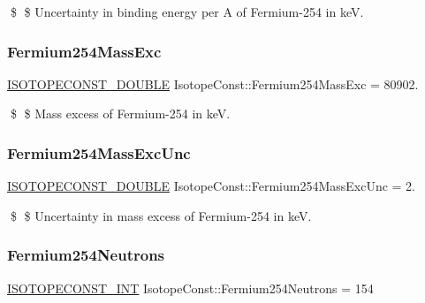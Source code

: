 \$ \$ Uncertainty in binding energy per A of Fermium-\/254 in keV. \mbox{\label{group___isotope_const-_fermium-_fm254_ga76acac32ded6bdae75aa7101c78c126a}} 
\subsubsection{\texorpdfstring{Fermium254\+Mass\+Exc}{Fermium254MassExc}}
{\footnotesize\ttfamily \mbox{\hyperlink{group___isotope_const-_macros_ga8f45a7272ce02c0b4c65c44636ed719a}{I\+S\+O\+T\+O\+P\+E\+C\+O\+N\+S\+T\+\_\+\+D\+O\+U\+B\+LE}} Isotope\+Const\+::\+Fermium254\+Mass\+Exc = 80902.}

\$ \$ Mass excess of Fermium-\/254 in keV. \mbox{\label{group___isotope_const-_fermium-_fm254_ga8251dc71cfe5954902f8e032d7c86094}} 
\subsubsection{\texorpdfstring{Fermium254\+Mass\+Exc\+Unc}{Fermium254MassExcUnc}}
{\footnotesize\ttfamily \mbox{\hyperlink{group___isotope_const-_macros_ga8f45a7272ce02c0b4c65c44636ed719a}{I\+S\+O\+T\+O\+P\+E\+C\+O\+N\+S\+T\+\_\+\+D\+O\+U\+B\+LE}} Isotope\+Const\+::\+Fermium254\+Mass\+Exc\+Unc = 2.}

\$ \$ Uncertainty in mass excess of Fermium-\/254 in keV. \mbox{\label{group___isotope_const-_fermium-_fm254_gafe78cd40498ce5bdb948afb7f386ea99}} 
\subsubsection{\texorpdfstring{Fermium254\+Neutrons}{Fermium254Neutrons}}
{\footnotesize\ttfamily \mbox{\hyperlink{group___isotope_const-_macros_ga5f18360b3e99483a35c32d789e62621c}{I\+S\+O\+T\+O\+P\+E\+C\+O\+N\+S\+T\+\_\+\+I\+NT}} Isotope\+Const\+::\+Fermium254\+Neutrons = 154}

